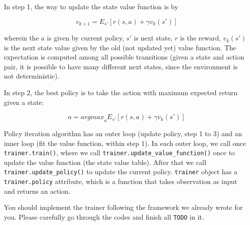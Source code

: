 \documentclass[11pt]{article}
\begin{document}
In step 1, the way to update the state value function is by

\[v_{k+1} = E_{s'}[r(s, a)+\gamma v_{k}(s')]\]

wherein the \(a\) is given by current policy, \(s'\) is next state,
\(r\) is the reward, \(v_{k}(s')\) is the next state value given by the
old (not updated yet) value function. The expectation is computed among
all possible transitions (given a state and action pair, it is possible
to have many different next states, since the environment is not
deterministic).

In step 2, the best policy is to take the action with maximum expected
return given a state:

\[a = {argmax}_a E_{s'}[r(s, a) + \gamma v_{k}(s')]\]

Policy iteration algorithm has an outer loop (update policy, step 1 to
3) and an inner loop (fit the value function, within step 1). In each
outer loop, we call once \texttt{trainer.train()}, where we call
\texttt{trainer.update\_value\_function()} once to update the value
function (the state value table). After that we call
\texttt{trainer.update\_policy()} to update the current policy.
\texttt{trainer} object has a \texttt{trainer.policy} attribute, which
is a function that takes observation as input and returns an action.

You should implement the trainer following the framework we already
wrote for you. Please carefully go through the codes and finish all
\texttt{TODO} in it.
\end{document}
